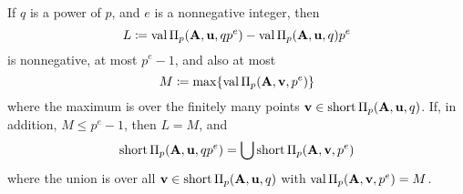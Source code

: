 \documentclass{amsart}
\begin{document}
\begin{theorem}
\label{general AIP: T}
If $q$ is a power of $p$, and $e$ is a nonnegative integer, then
\[  L \coloneqq \operatorname{val} \Pi_p(\mathbf{A}, \mathbf{u}, qp^e) -  \operatorname{val} \Pi_p(\mathbf{A}, \mathbf{u}, q)p^e  \]
is nonnegative, at most $p^e-1$, and also at most
\[ M \coloneqq \max \{ \operatorname{val} \Pi_p(\mathbf{A}, \mathbf{v}, p^e)  \}\]
where the maximum is over the finitely many points $\mathbf{v} \in \operatorname{short} \Pi_p(\mathbf{A}, \mathbf{u}, q)$.
If, in addition, $M \le p^e-1$,  then $L=M$, and
\[  \operatorname{short} \Pi_p(\mathbf{A}, \mathbf{u}, qp^e) = \bigcup \operatorname{short} \Pi_p(\mathbf{A}, \mathbf{v}, p^e)\]
where the union is over all $\mathbf{v} \in \operatorname{short} \Pi_p(\mathbf{A}, \mathbf{u}, q)$ with $\operatorname{val} \Pi_p(\mathbf{A},\mathbf{v},p^e) = M$.
\end{theorem}
\end{document}
